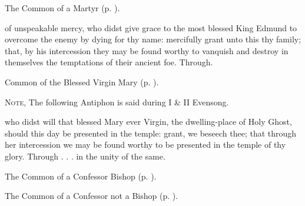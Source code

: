 \begin{rubric}
	The Common of a Martyr (p. \pageref{CommonMartyr}).
\end{rubric}

{} of unspeakable mercy, who didst give grace to the most blessed King Edmund to overcome the enemy by dying for thy name: mercifully grant unto this thy family; that, by his intercession they may be found worthy to vanquish and destroy in themselves the temptations of their ancient foe. Through.



\begin{rubric}
	Common of the Blessed Virgin Mary (p. \pageref{CommonBVM}).
\end{rubric}

\begin{rubric}
	\textsc{Note,} The following Antiphon is said during I \& II Evensong.
\end{rubric}


\collect
{} who didst will that blessed Mary ever Virgin, the dwelling-place of Holy Ghost, should this day be presented in the temple: grant, we beseech thee; that through her intercession we may be found worthy to be presented in the temple of thy glory. Through . . . in the unity of the same.



\begin{rubric}
	The Common of a Confessor Bishop (p. \pageref{ConfessorBishopCollect}).
\end{rubric}



\begin{rubric}
	The Common of a Confessor not a Bishop (p. \pageref{ConfessorNotBishopCollect}).
\end{rubric}



